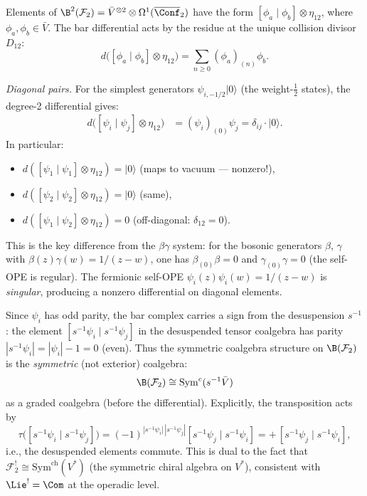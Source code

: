 \begin{computation}
\label{comp:fermion-deg2}
Elements of $\B^2(\mathcal{F}_2) = \bar{V}^{\otimes 2}
\otimes \Omega^1(\overline{\Conf}_2)$ have the form
$[\phi_a \mid \phi_b] \otimes \eta_{12}$, where $\phi_a, \phi_b \in \bar{V}$.
The bar differential acts by the residue at the unique collision divisor $D_{12}$:
\begin{equation}\label{eq:fermion-bar-d2}
d\bigl([\phi_a \mid \phi_b] \otimes \eta_{12}\bigr)
= \sum_{n \geq 0} (\phi_a)_{(n)}\phi_b.
\end{equation}

\emph{Diagonal pairs.}
For the simplest generators $\psi_{i,-1/2}|0\rangle$ (the weight-$\frac{1}{2}$
states), the degree-2 differential gives:
\begin{align}
d\bigl([\psi_i \mid \psi_j] \otimes \eta_{12}\bigr)
&= (\psi_i)_{(0)}\psi_j = \delta_{ij}\cdot |0\rangle.
\label{eq:fermion-d2-simple}
\end{align}
In particular:
\begin{itemize}
\item $d([\psi_1 \mid \psi_1] \otimes \eta_{12}) = |0\rangle$
  \quad (maps to vacuum --- nonzero!),
\item $d([\psi_2 \mid \psi_2] \otimes \eta_{12}) = |0\rangle$
  \quad (same),
\item $d([\psi_1 \mid \psi_2] \otimes \eta_{12}) = 0$
  \quad (off-diagonal: $\delta_{12} = 0$).
\end{itemize}

This is the key difference from the $\beta\gamma$ system: for the
bosonic generators $\beta$, $\gamma$ with $\beta(z)\gamma(w) = 1/(z-w)$,
one has $\beta_{(0)}\beta = 0$ and $\gamma_{(0)}\gamma = 0$
(the self-OPE is regular).  The fermionic self-OPE
$\psi_i(z)\psi_i(w) = 1/(z-w)$ is \emph{singular}, producing a
nonzero differential on diagonal elements.
\end{computation}

\begin{computation}
\label{comp:fermion-deg2-signs}
Since $\psi_i$ has odd parity, the bar complex carries a
sign from the desuspension $s^{-1}$:
the element $[s^{-1}\psi_i \mid s^{-1}\psi_j]$ in the
desuspended tensor coalgebra has parity $|s^{-1}\psi_i| = |\psi_i| - 1 = 0$
(even).  Thus the symmetric coalgebra structure on $\B(\mathcal{F}_2)$
is the \emph{symmetric} (not exterior) coalgebra:
\[
\B(\mathcal{F}_2) \cong \mathrm{Sym}^c(s^{-1}\bar{V})
\]
as a graded coalgebra (before the differential).
Explicitly, the transposition acts by
\[
\tau\bigl([s^{-1}\psi_i \mid s^{-1}\psi_j]\bigr)
= (-1)^{|s^{-1}\psi_i|\,|s^{-1}\psi_j|}
  [s^{-1}\psi_j \mid s^{-1}\psi_i]
= +\,[s^{-1}\psi_j \mid s^{-1}\psi_i],
\]
i.e., the desuspended elements commute.  This is dual to the
fact that $\mathcal{F}_2^! \cong \mathrm{Sym}^{\mathrm{ch}}(V^*)$
(the symmetric chiral algebra on $V^*$), consistent with
$\Lie^! = \Com$ at the operadic level.
\end{computation}

